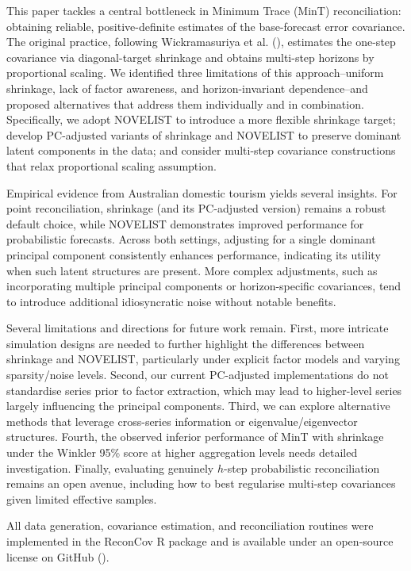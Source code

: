\documentclass[
  11pt,
  letterpaper,
  DIV=11,
  numbers=noendperiod,
  titlepage]{scrartcl}
\begin{document}
This paper tackles a central bottleneck in Minimum Trace (MinT)
reconciliation: obtaining reliable, positive-definite estimates of the
base-forecast error covariance. The original practice, following
Wickramasuriya et al. (),
estimates the one-step covariance via diagonal-target shrinkage and
obtains multi-step horizons by proportional scaling. We identified three
limitations of this approach--uniform shrinkage, lack of factor
awareness, and horizon-invariant dependence--and proposed alternatives
that address them individually and in combination. Specifically, we
adopt NOVELIST to introduce a more flexible shrinkage target; develop
PC-adjusted variants of shrinkage and NOVELIST to preserve dominant
latent components in the data; and consider multi-step covariance
constructions that relax proportional scaling assumption.

Empirical evidence from Australian domestic tourism yields several
insights. For point reconciliation, shrinkage (and its PC-adjusted
version) remains a robust default choice, while NOVELIST demonstrates
improved performance for probabilistic forecasts. Across both settings,
adjusting for a single dominant principal component consistently
enhances performance, indicating its utility when such latent structures
are present. More complex adjustments, such as incorporating multiple
principal components or horizon-specific covariances, tend to introduce
additional idiosyncratic noise without notable benefits.

Several limitations and directions for future work remain. First, more
intricate simulation designs are needed to further highlight the
differences between shrinkage and NOVELIST, particularly under explicit
factor models and varying sparsity/noise levels. Second, our current
PC-adjusted implementations do not standardise series prior to factor
extraction, which may lead to higher-level series largely influencing
the principal components. Third, we can explore alternative methods that
leverage cross-series information or eigenvalue/eigenvector structures.
Fourth, the observed inferior performance of MinT with shrinkage under
the Winkler 95\% score at higher aggregation levels needs detailed
investigation. Finally, evaluating genuinely \(h\)-step probabilistic
reconciliation remains an open avenue, including how to best regularise
multi-step covariances given limited effective samples.

All data generation, covariance estimation, and reconciliation routines
were implemented in the ReconCov R package and is available under an
open‐source license on GitHub ().
\end{document}
